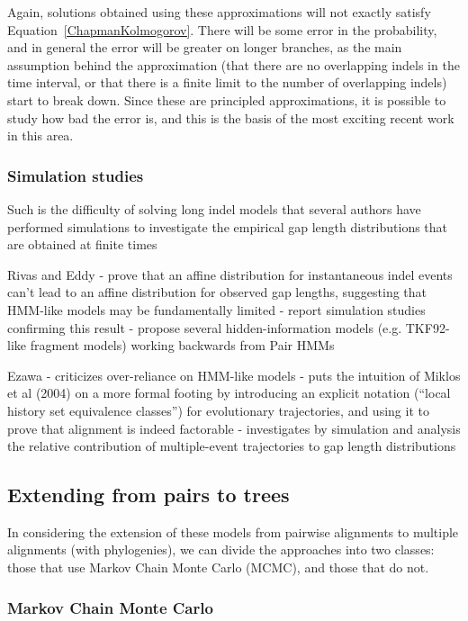 \documentclass{bmcart}
\newcommand{\eqref}[1]{Equation~\ref{#1}}
\begin{document}
Again, solutions obtained using these approximations will not exactly satisfy \eqref{ChapmanKolmogorov}.
There will be some error in the probability, and in general the error will be greater
on longer branches, as the main assumption behind the approximation
(that there are no overlapping indels in the time interval, or that there is a finite
limit to the number of overlapping indels)
start to break down.
Since these are principled approximations, it is possible to study
how bad the error is, and this is the basis of the most exciting recent work in this area.

\subsubsection*{Simulation studies}

Such is the difficulty of solving long indel models that several authors have performed simulations
to investigate the empirical gap length distributions that are obtained at finite times

Rivas and Eddy \cite{RivasEddy2015}
 - prove that an affine distribution for instantaneous indel events can't lead to an affine distribution for observed gap lengths, suggesting that HMM-like models may be fundamentally limited
 - report simulation studies confirming this result
 - propose several hidden-information models (e.g. TKF92-like fragment models) working backwards from Pair HMMs

Ezawa \cite{Ezawa2016a,Ezawa2016b,Ezawa2016bErratum}
 - criticizes over-reliance on HMM-like models
 - puts the intuition of Miklos et al (2004) on a more formal footing by introducing an explicit notation (``local history set equivalence classes'') for evolutionary trajectories, and using it to prove that alignment is indeed factorable
 - investigates by simulation and analysis the relative contribution of multiple-event trajectories to gap length distributions


\subsection*{Extending from pairs to trees}

In considering the extension of these models from pairwise alignments
to multiple alignments (with phylogenies),
we can divide the approaches into two classes:
those that use Markov Chain Monte Carlo (MCMC), and those that do not.

\subsubsection*{Markov Chain Monte Carlo}
\end{document}
